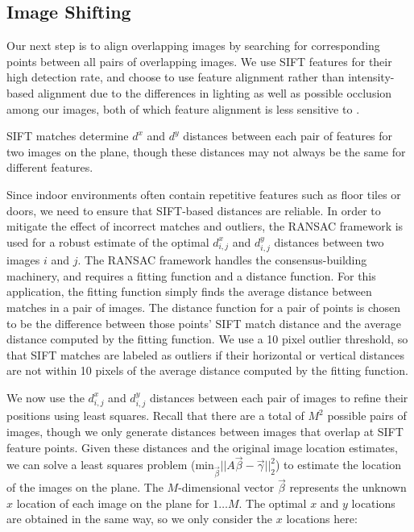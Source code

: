 \documentclass[10pt,twocolumn,letterpaper]{article}
\begin{document}
\subsection{Image Shifting}
\label{sec:robustSIFTFeatureMatching}
Our next step is to align overlapping images by searching for
corresponding points between all pairs of overlapping images. We use SIFT features for their high detection rate, and choose to use feature alignment rather than intensity-based alignment due to the differences in lighting as well as possible occlusion among our images, both of which feature alignment is less sensitive to \cite{lai1999robust, lowe1999object, mikolajczyk2005performance, szeliski2006image}.

SIFT matches determine $d^x$ and $d^y$ distances between each pair of
features for two images on the plane, though these distances may not
always be the same for different features.

Since indoor environments often contain repetitive features such as
floor tiles or doors, we need to ensure that SIFT-based distances are
reliable. In order to mitigate the effect of incorrect matches and
outliers, the RANSAC framework \cite{fischler1981random} is used for a
robust estimate of the optimal $d^x_{i,j}$ and $d^y_{i,j}$ distances
between two images $i$ and $j$. The RANSAC framework handles the
consensus-building machinery, and requires a fitting function and a
distance function. For this application, the fitting function simply
finds the average distance between matches in a pair of images. The
distance function for a pair of points is chosen to be the difference
between those points' SIFT match distance and the average distance
computed by the fitting function. We use a 10 pixel outlier threshold,
so that SIFT matches are labeled as outliers if their horizontal or
vertical distances are not within 10 pixels of the average distance
computed by the fitting function.

We now use the $d^x_{i,j}$ and $d^y_{i,j}$ distances between each pair
of images to refine their positions using least squares. Recall that
there are a total of $M^{2}$ possible pairs of images, though we only
generate distances between images that overlap at SIFT feature
points. Given these distances and the original image location
estimates, we can solve a least squares problem
($\textrm{min}_{\vec{\beta}} ||A \vec{\beta} - \vec{\gamma}||_2^2 $)
to estimate the location of the images on the plane. The
$M$-dimensional vector $\vec{\beta}$ represents the unknown $x$
location of each image on the plane for $1 \dots M$. The optimal $x$
and $y$ locations are obtained in the same way, so we only consider
the $x$ locations here:
\end{document}
